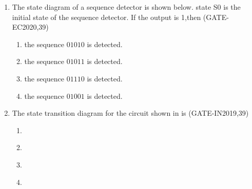 \begin{enumerate}[label=\arabic*.,ref=\theenumi]
\item The state diagram of a sequence detector is shown below. state S0 is the initial state of the sequence detector. If the output is 1,then
                                        \hfill(GATE-EC2020,39)
	\begin{figure}[H]
    \centering
    \resizebox{0.75\columnwidth}{!}{%
    
	}
    \caption{}
	\label{fig:GATE EC2020,39}
\end{figure}
%    	
\begin{enumerate}
\item   the sequence $01010$ is detected.
\item   the sequence $01011$ is detected.
\item   the sequence $01110$ is detected.
\item   the sequence $01001$ is detected.
\end{enumerate}
%
\item The state transition diagram for the circuit shown in 
	is
                         \hfill(GATE-IN2019,39)
\begin{figure}[H]
\centering
    \resizebox{0.75\columnwidth}{!}{%

	}
    \caption{}
	\label{fig:GATE IN2019,39}
\end{figure}

\begin{enumerate}
\item 
\begin{figure}[H]
\centering
    \resizebox{0.75\columnwidth}{!}{%

	}
    \caption{}
	\label{fig:GATE IN2019,39-1}
\end{figure}
\item 
\begin{figure}[H]
\centering
    \resizebox{0.75\columnwidth}{!}{%

	}
    \caption{}
	\label{fig:GATE IN2019,39-2}
\end{figure}
\item 
\begin{figure}[H]
\centering
    \resizebox{0.75\columnwidth}{!}{%

	}
    \caption{}
	\label{fig:GATE IN2019,39-3}
\end{figure}
\item 
\begin{figure}[H]
\centering
    \resizebox{0.75\columnwidth}{!}{%

	}
    \caption{}
	\label{fig:GATE IN2019,39-4}
\end{figure}


\end{enumerate}
\end{enumerate}
